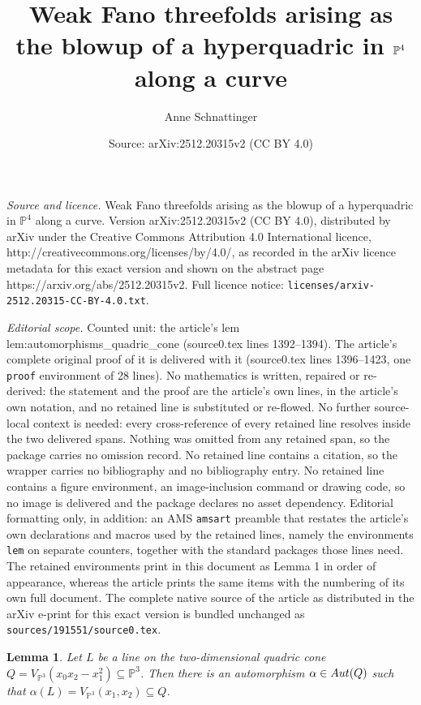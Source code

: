 \documentclass[10pt,a4paper]{amsart}
\title{Weak Fano threefolds arising as the blowup of a hyperquadric in \texorpdfstring{$\Pfour$}{P4} along a curve}
\author{Anne Schnattinger}
\date{Source: arXiv:2512.20315v2 (CC BY 4.0)}
\newcommand{\Pfour}{\mathbb{P}^4}
\newtheorem{lem}{Lemma}
\newcommand{\Aut}{\textup{Aut}}
\newcommand{\Pthree}{\mathbb{P}^3}
\newcommand{\VPthree}{V_{\Pthree}}
\newcommand{\sub}{\subseteq}
\begin{document}
\maketitle

\noindent\emph{Source and licence.} Weak Fano threefolds arising as the blowup of a hyperquadric in \texorpdfstring{$\Pfour$}{P4} along a curve. Version arXiv:2512.20315v2 (CC BY 4.0), distributed by arXiv under the Creative Commons Attribution 4.0 International licence, http://creativecommons.org/licenses/by/4.0/, as recorded in the arXiv licence metadata for this exact version and shown on the abstract page https://arxiv.org/abs/2512.20315v2. Full licence notice: \texttt{licenses/arxiv-2512.20315-CC-BY-4.0.txt}.\par\smallskip

\noindent\textit{Editorial scope.} Counted unit: the article's lem lem:automorphisms\_quadric\_cone (source0.tex lines 1392--1394). The article's complete original proof of it is delivered with it (source0.tex lines 1396--1423, one \texttt{proof} environment of 28 lines). No mathematics is written, repaired or re-derived: the statement and the proof are the article's own lines, in the article's own notation, and no retained line is substituted or re-flowed.  No further source-local context is needed: every cross-reference of every retained line resolves inside the two delivered spans.  Nothing was omitted from any retained span, so the package carries no omission record.  No retained line contains a citation, so the wrapper carries no bibliography and no bibliography entry.  No retained line contains a figure environment, an image-inclusion command or drawing code, so no image is delivered and the package declares no asset dependency.  Editorial formatting only, in addition: an AMS \texttt{amsart} preamble that restates the article's own declarations and macros used by the retained lines, namely the environments \texttt{lem} on separate counters, together with the standard packages those lines need.  The retained environments print in this document as Lemma 1 in order of appearance, whereas the article prints the same items with the numbering of its own full document.  The complete native source of the article as distributed in the arXiv e-print for this exact version is bundled unchanged as \texttt{sources/191551/source0.tex}.
\begin{lem} \label{lem:automorphisms_quadric_cone}
Let $L$ be a line on the two-dimensional quadric cone $Q=\VPthree(x_0x_2-x_1^2)\sub \Pthree$. Then there is an automorphism $\alpha \in \Aut(Q)$ such that $\alpha(L)=\VPthree(x_1,x_2)\sub Q$. 
\end{lem}
\end{document}
